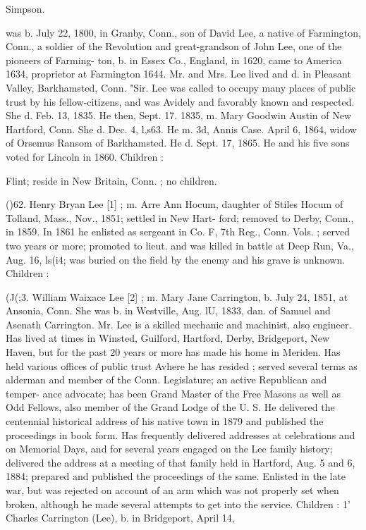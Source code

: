 \documentclass[oneside]{book}
\begin{document}
Simpson. 







was b. July 22, 1800, in Granby, Conn., son of David Lee, a 
native of Farmington, Conn., a soldier of the Revolution and 
great-grandson of John Lee, one of the pioneers of Farming- 
ton, b. in Essex Co., England, in 1620, came to America 1634, 
proprietor at Farmington 1644. Mr. and Mrs. Lee lived and 
d. in Pleasant Valley, Barkhamsted, Conn. "Sir. Lee was called 
to occupy many places of public trust by his fellow-citizens, 
and was Avidely and favorably known and respected. She d. 
Feb. 13, 1835. He then, Sept. 17. 1835, m. Mary Goodwin 
Austin of New Hartford, Conn. She d. Dec. 4, l,s63. He m. 
3d, Annis Case. April 6, 1864, widow of Orsemus Ransom of 
Barkhamsted. He d. Sept. 17, 1865. He and his five sons 
voted for Lincoln in 1860. Children : 










Flint; reside in New Britain, Conn. ; no children. 

()62. Henry Bryan Lee [1] ; m. Arre Ann Hocum, daughter of Stiles 
Hocum of Tolland, Mass., Nov., 1851; settled in New Hart- 
ford; removed to Derby, Conn., in 1859. In 1861 he enlisted 
as sergeant in Co. F, 7th Reg., Conn. Vols. ; served two years 
or more; promoted to lieut. and was killed in battle at Deep 
Run, Va., Aug. 16, ls(i4; was buried on the field by the enemy 
and his grave is unknown. Children : 










(J(;3. William Waixace Lee [2] ; m. Mary Jane Carrington, b. July 
24, 1851, at Ansonia, Conn. She was b. in Westville, Aug. lU, 
1833, dan. of Samuel and Asenath Carrington. Mr. Lee is a 
skilled mechanic and machinist, also engineer. Has lived at 
times in Winsted, Guilford, Hartford, Derby, Bridgeport, New 
Haven, but for the past 20 years or more has made his home in 
Meriden. Has held various offices of public trust Avhere he 
has resided ; served several terms as alderman and member 
of the Conn. Legislature; an active Republican and temper- 
ance advocate; has been Grand Master of the Free Masons 
as well as Odd Fellows, also member of the Grand Lodge of 
the U. S. He delivered the centennial historical address of 
his native town in 1879 and published the proceedings in book 
form. Has frequently delivered addresses at celebrations and 
on Memorial Days, and for several years engaged on the Lee 
family history; delivered the address at a meeting of that 
family held in Hartford, Aug. 5 and 6, 1884; prepared and 
published the proceedings of the same. Enlisted in the late 
war, but was rejected on account of an arm which was not 
properly set when broken, although he made several attempts 
to get into the service. Children : 
1' Charles Carrington (Lee), b. in Bridgeport, April 14, 
\end{document}

